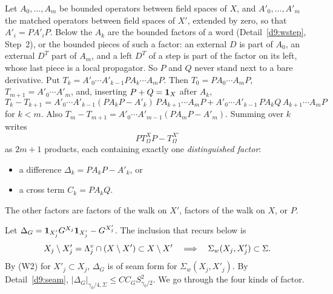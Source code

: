 \begin{detail}
\begin{step}
Let $A_0,\dots,A_m$ be bounded operators between field spaces of $X$, and $A'_0,\dots,A'_m$ the matched operators between field spaces of $X'$, extended by zero, so that $A'_i=PA'_iP$. Below the $A_k$ are the bounded factors of a word (Detail~\ref{d9:wstep}, Step~2), or the bounded pieces of such a factor: an external $D$ is part of $A_0$, an external $D^T$ part of $A_m$, and a left $D^T$ of a step is part of the factor on its left, whose last piece is a local propagator. So $P$ and $Q$ never stand next to a bare derivative. Put $T_k=A'_0\cdots A'_{k-1}PA_k\cdots A_mP$. Then $T_0=PA_0\cdots A_mP$, $T_{m+1}=A'_0\cdots A'_m$, and, inserting $P+Q=\mathbf 1_X$ after $A_k$,
\[
T_k-T_{k+1}=A'_0\cdots A'_{k-1}(PA_kP-A'_k)\,PA_{k+1}\cdots A_mP+A'_0\cdots A'_{k-1}\,PA_kQ\,A_{k+1}\cdots A_mP
\]
for $k<m$. Also $T_m-T_{m+1}=A'_0\cdots A'_{m-1}(PA_mP-A'_m)$. Summing over $k$ writes
\[
PT^X_\Omega P-T^{X'}_\Omega
\]
as $2m+1$ products, each containing exactly one \emph{distinguished factor}:
\begin{itemize}
\item a difference $\Delta_k=PA_kP-A'_k$, or
\item a cross term $C_k=PA_kQ$.
\end{itemize}
The other factors are factors of the walk on $X'$, factors of the walk on $X$, or $P$.
\end{step}
\begin{step}
Let $\Delta_G=\mathbf 1_{X'_j}G^{X_j}\mathbf 1_{X'_j}-G^{X'_j}$. The inclusion that recurs below is
\[
X_j\setminus X'_j=\Lambda^v_j\cap(X\setminus X')\subset X\setminus X'\quad\Longrightarrow\quad\Sigma_w(X_j,X'_j)\subset\Sigma .
\]
By (W2) for $X'_j\subset X_j$, $\Delta_G$ is of seam form for $\Sigma_w(X_j,X'_j)$. By Detail~\ref{d9:seam}, $|\Delta_G|_{\gamma_0/4,\Sigma}\le CC_GS^2_{\gamma_0/2}$. We go through the four kinds of factor.
\begin{enumerate}[label=(\alph*)]

\end{enumerate}
\end{step}
\end{detail}
